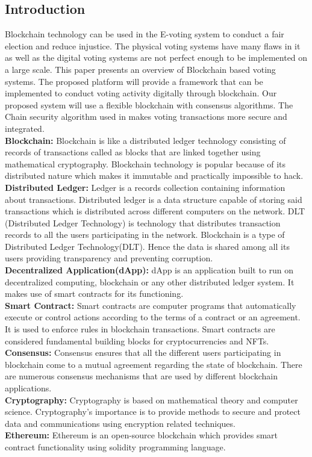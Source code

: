 \documentclass[oneside, 12pt]{book}
\begin{document}
\subsection{Introduction}
Blockchain technology can be used in the E-voting system to conduct a fair election and reduce injustice. The physical voting systems have many flaws in it as well as the digital voting systems are not perfect enough to be implemented on a large scale. This paper presents an overview of Blockchain based voting systems. The proposed platform will provide a framework that can be implemented to conduct voting activity digitally through blockchain. Our proposed system will use a flexible blockchain with consensus algorithms. The Chain security algorithm used in makes voting transactions more secure and integrated.
\\\textbf{Blockchain:} Blockchain is like a distributed ledger technology consisting of records of transactions called as blocks that are linked together using mathematical cryptography. Blockchain technology is popular because of its distributed nature which makes it immutable and practically impossible to hack.
\\\textbf{Distributed Ledger:} Ledger is a records collection containing information about transactions. Distributed ledger is a data structure capable of storing said transactions which is distributed across different computers on the network. DLT (Distributed Ledger Technology) is technology that distributes transaction records to all the users participating in the network. Blockchain is a type of Distributed Ledger Technology(DLT). Hence the data is shared among all its users providing transparency and preventing corruption.
\\\textbf{Decentralized Application(dApp):} dApp is an application built to run on decentralized computing, blockchain or any other distributed ledger system. It makes use of smart contracts for its functioning.
\\\textbf{Smart Contract:} Smart contracts are computer programs that automatically execute or control actions according to the terms of a contract or an agreement. It is used to enforce rules in blockchain transactions. Smart contracts are considered fundamental building blocks for cryptocurrencies and NFTs.
\\\textbf{Consensus:} Consensus ensures that all the different users participating in blockchain come to a mutual agreement regarding the state of blockchain. There are numerous consensus mechanisms that are used by different blockchain applications.
\\\textbf{Cryptography:} Cryptography is based on mathematical theory and computer science. Cryptography’s importance is to provide methods to secure and protect data and communications using encryption related techniques.
\\\textbf{Ethereum:} Ethereum is an open-source blockchain which provides smart contract functionality using solidity programming language.
\newpage
\end{document}
